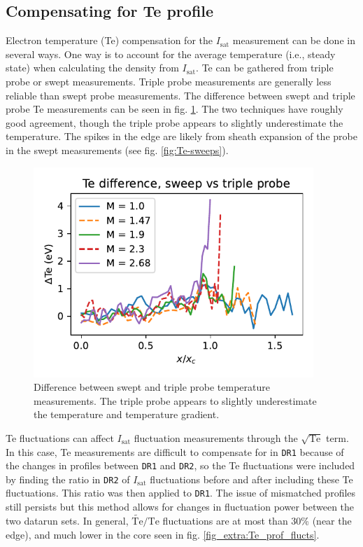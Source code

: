 \subsection{Compensating for Te profile}

Electron temperature (Te) compensation for the $I_\text{sat}$ measurement can be done in several ways. One way is to account for the average temperature (i.e., steady state) when calculating the density from $I_\text{sat}$. Te can be gathered from triple probe or swept measurements. Triple probe measurements are generally less reliable than swept probe measurements. The difference between swept and triple probe Te measurements can be seen in fig. \ref{fig:Te_swept_vs_triple}. The two techniques have roughly good agreement, though the triple probe appears to slightly underestimate the temperature. The spikes in the edge are likely from sheath expansion of the probe in the swept measurements (see fig. \ref{fig:Te-sweeps}). 

\begin{figure}
    \centering
    \includegraphics[width=300pt]{figures/Te_sweep-TP_diff.pdf}
    \caption[Swept vs triple probe measurements]{Difference between swept and triple probe temperature measurements. The triple probe appears to slightly underestimate the temperature and temperature gradient. }
    \label{fig:Te_swept_vs_triple}
\end{figure}

Te fluctuations can affect $I_\text{sat}$ fluctuation measurements through the $\sqrt{\text{Te}}$ term. In this case, Te measurements are difficult to compensate for in \texttt{DR1} because of the changes in profiles between \texttt{DR1} and \texttt{DR2}, so the Te fluctuations were included by finding the ratio in \texttt{DR2} of $I_\text{sat}$ fluctuations before and after including these Te fluctuations. This ratio was then applied to \texttt{DR1}. The issue of mismatched profiles still persists but this method allows for changes in fluctuation power between the two datarun sets. In general, $\widetilde{\text{Te}} / \text{Te}$ fluctuations are at most than 30\% (near the edge), and much lower in the core seen in fig. \ref{fig_extra:Te_prof_flucts}. 

